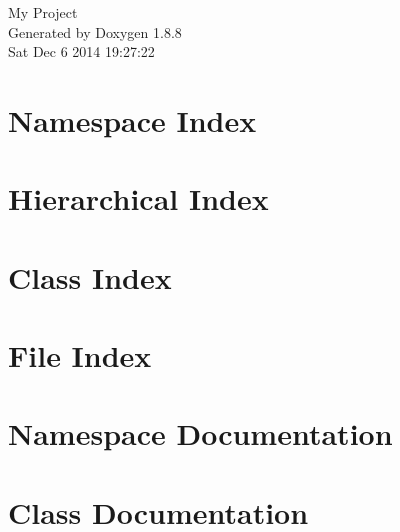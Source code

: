 \documentclass[twoside]{book}
\newcommand{\+}{\discretionary{\mbox{\scriptsize$\hookleftarrow$}}{}{}}
\newcommand{\clearemptydoublepage}{%
  \newpage{\pagestyle{empty}\cleardoublepage}%
}
\begin{document}
\hypersetup{pageanchor=false,
             bookmarks=true,
             bookmarksnumbered=true,
             pdfencoding=unicode
            }
\begin{titlepage}
\vspace*{7cm}
\begin{center}%
{\Large My Project }\\
\vspace*{1cm}
{\large Generated by Doxygen 1.8.8}\\
\vspace*{0.5cm}
{\small Sat Dec 6 2014 19:27:22}\\
\end{center}
\end{titlepage}
\clearemptydoublepage
\tableofcontents
\clearemptydoublepage
{}
\hypersetup{pageanchor=true}

\chapter{Namespace Index}

\chapter{Hierarchical Index}

\chapter{Class Index}

\chapter{File Index}

\chapter{Namespace Documentation}

\chapter{Class Documentation}









\end{document}

